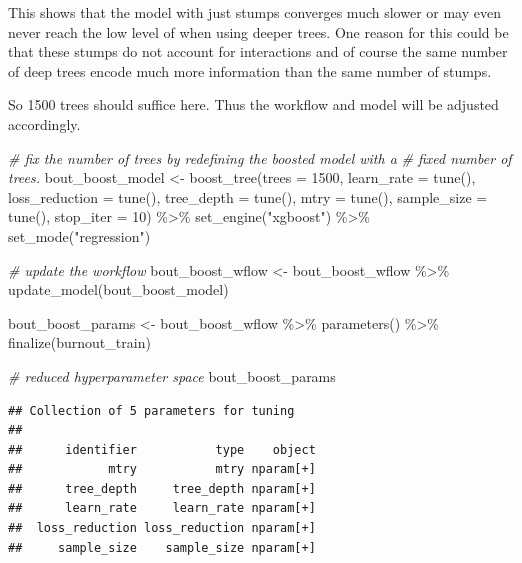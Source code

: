 \documentclass[
]{book}
\newenvironment{Shaded}{\begin{snugshade}}{\end{snugshade}}
\newcommand{\AttributeTok}[1]{\textcolor[rgb]{0.77,0.63,0.00}{#1}}
\newcommand{\CommentTok}[1]{\textcolor[rgb]{0.56,0.35,0.01}{\textit{#1}}}
\newcommand{\DecValTok}[1]{\textcolor[rgb]{0.00,0.00,0.81}{#1}}
\newcommand{\FunctionTok}[1]{\textcolor[rgb]{0.00,0.00,0.00}{#1}}
\newcommand{\NormalTok}[1]{#1}
\newcommand{\OtherTok}[1]{\textcolor[rgb]{0.56,0.35,0.01}{#1}}
\newcommand{\SpecialCharTok}[1]{\textcolor[rgb]{0.00,0.00,0.00}{#1}}
\newcommand{\StringTok}[1]{\textcolor[rgb]{0.31,0.60,0.02}{#1}}
\begin{document}
This shows that the model with just stumps converges much slower or may even never reach the low level of when using deeper trees. One reason for this could be that these stumps do not account for interactions and of course the same number of deep trees encode much more information than the same number of stumps.

So 1500 trees should suffice here. Thus the workflow and model will be adjusted accordingly.

\begin{Shaded}
\begin{Highlighting}[]
\CommentTok{\# fix the number of trees by redefining the boosted model with a }
\CommentTok{\# fixed number of trees.}
\NormalTok{bout\_boost\_model }\OtherTok{\textless{}{-}} \FunctionTok{boost\_tree}\NormalTok{(}\AttributeTok{trees =} \DecValTok{1500}\NormalTok{,}
                               \AttributeTok{learn\_rate =} \FunctionTok{tune}\NormalTok{(),}
                               \AttributeTok{loss\_reduction =} \FunctionTok{tune}\NormalTok{(),}
                               \AttributeTok{tree\_depth =} \FunctionTok{tune}\NormalTok{(),}
                               \AttributeTok{mtry =} \FunctionTok{tune}\NormalTok{(),}
                               \AttributeTok{sample\_size =} \FunctionTok{tune}\NormalTok{(),}
                               \AttributeTok{stop\_iter =} \DecValTok{10}\NormalTok{) }\SpecialCharTok{\%\textgreater{}\%}
  \FunctionTok{set\_engine}\NormalTok{(}\StringTok{"xgboost"}\NormalTok{) }\SpecialCharTok{\%\textgreater{}\%} 
  \FunctionTok{set\_mode}\NormalTok{(}\StringTok{"regression"}\NormalTok{)}

\CommentTok{\# update the workflow}
\NormalTok{bout\_boost\_wflow }\OtherTok{\textless{}{-}}
\NormalTok{  bout\_boost\_wflow }\SpecialCharTok{\%\textgreater{}\%}
  \FunctionTok{update\_model}\NormalTok{(bout\_boost\_model)}

\NormalTok{bout\_boost\_params }\OtherTok{\textless{}{-}}\NormalTok{ bout\_boost\_wflow }\SpecialCharTok{\%\textgreater{}\%}
  \FunctionTok{parameters}\NormalTok{() }\SpecialCharTok{\%\textgreater{}\%}
  \FunctionTok{finalize}\NormalTok{(burnout\_train)}

\CommentTok{\# reduced hyperparameter space}
\NormalTok{bout\_boost\_params}
\end{Highlighting}
\end{Shaded}

\begin{verbatim}
## Collection of 5 parameters for tuning
## 
##      identifier           type    object
##            mtry           mtry nparam[+]
##      tree_depth     tree_depth nparam[+]
##      learn_rate     learn_rate nparam[+]
##  loss_reduction loss_reduction nparam[+]
##     sample_size    sample_size nparam[+]
\end{verbatim}
\end{document}
